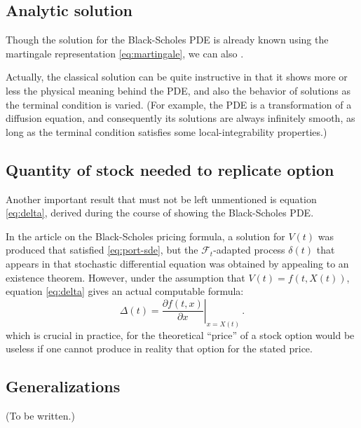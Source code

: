 \documentclass[12pt]{article}
\providecommand{\pd}[2]{\frac{\partial #1}{\partial #2}}
\newcommand{\sF}{\mathcal{F}}
\begin{document}
\subsection{Analytic solution}

Though the solution for the Black-Scholes PDE
is already known using the martingale representation \eqref{eq:martingale},
we can also .

Actually, the classical solution can be quite instructive
in that it shows more or less the physical meaning
behind the PDE, and also the behavior of solutions
as the terminal condition is varied.  (For example,
the PDE is a transformation of a diffusion equation,
and consequently its solutions are always infinitely smooth,
as long as the terminal condition satisfies 
some local-integrability properties.)

\subsection{Quantity of stock needed to replicate option}

Another important result that 
must not be left unmentioned is
equation \eqref{eq:delta}, derived during
the course of showing the Black-Scholes PDE.

In the article on the Black-Scholes pricing formula,
a solution for $V(t)$ was produced
that satisfied \eqref{eq:port-sde},
but the $\sF_t$-adapted process $\delta(t)$
that appears in that stochastic differential equation was 
obtained by appealing to an existence theorem.
However, under the assumption that $V(t) = f(t,X(t))$,
equation \eqref{eq:delta} gives an actual computable formula:
\[
\Delta(t) = \left.\pd{f(t,x)}{x} \right|_{x = X(t)}\,.
\]
which is crucial in practice, 
for the theoretical ``price''
of a stock option 
would be useless if one cannot produce in reality that option
for the stated price.

\subsection{Generalizations}

(To be written.)

\end{document}
